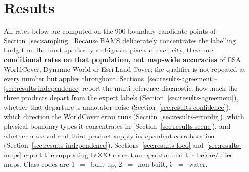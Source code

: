 
\section{Results}\label{sec:results}

All rates below are computed on the 900 boundary-candidate points of
Section~\ref{sec:sampling}. Because BAMS deliberately concentrates the labelling
budget on the most spectrally ambiguous pixels of each city, these are
\textbf{conditional rates on that population, not map-wide accuracies} of ESA
WorldCover, Dynamic World or Esri Land Cover; the qualifier is not repeated at
every number but applies throughout. Sections~\ref{sec:results-agreement}--\ref{sec:results-independence}
report the multi-reference diagnostic: how much the three products depart from
the expert labels (Section~\ref{sec:results-agreement}), whether that departure
is annotator noise (Section~\ref{sec:results-confidence}), which direction the
WorldCover error runs (Section~\ref{sec:results-errordir}), which physical
boundary types it concentrates in (Section~\ref{sec:results-scene}), and whether
a second and third product supply independent corroboration
(Section~\ref{sec:results-independence}). Sections~\ref{sec:results-loco}
and~\ref{sec:results-maps} report the supporting LOCO correction operator and
the before/after maps. Class codes are 1~$=$~built-up, 2~$=$~non-built,
3~$=$~water.

